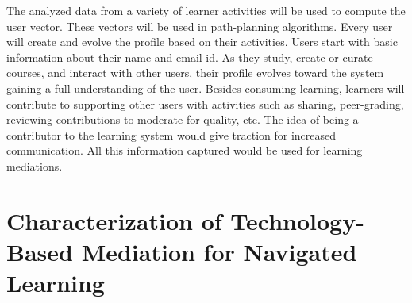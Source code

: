 \begin{multicols}{2}
The analyzed data from a variety of learner activities will be used to compute the user vector. These vectors will be used in path-planning algorithms. Every user will create and evolve the profile based on their activities. Users start with basic information about their name and email-id. As they study, create or curate courses, and interact with other users, their profile evolves toward the system gaining a full understanding of the user. Besides consuming learning, learners will contribute to supporting other users with activities such as sharing, peer-grading, reviewing contributions to moderate for quality, etc. The idea of being a contributor to the learning system would give traction for increased communication. All this information captured would be used for learning
mediations.

\section{Characterization of Technology-Based Mediation for Navigated Learning}


\end{multicols}
